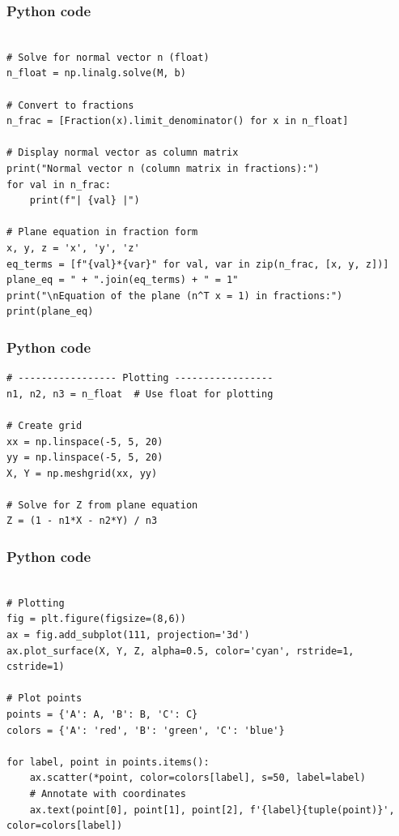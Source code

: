 \documentclass{beamer}
\begin{document}
\begin{frame}[fragile]                            
\frametitle{Python code}                
\begin{lstlisting}

# Solve for normal vector n (float)
n_float = np.linalg.solve(M, b)

# Convert to fractions
n_frac = [Fraction(x).limit_denominator() for x in n_float]

# Display normal vector as column matrix
print("Normal vector n (column matrix in fractions):")
for val in n_frac:
    print(f"| {val} |")

# Plane equation in fraction form
x, y, z = 'x', 'y', 'z'
eq_terms = [f"{val}*{var}" for val, var in zip(n_frac, [x, y, z])]
plane_eq = " + ".join(eq_terms) + " = 1"
print("\nEquation of the plane (n^T x = 1) in fractions:")
print(plane_eq)

\end{lstlisting}
\end{frame}

\begin{frame}[fragile]                            
\frametitle{Python code}                
\begin{lstlisting}
# ----------------- Plotting -----------------
n1, n2, n3 = n_float  # Use float for plotting

# Create grid
xx = np.linspace(-5, 5, 20)
yy = np.linspace(-5, 5, 20)
X, Y = np.meshgrid(xx, yy)

# Solve for Z from plane equation
Z = (1 - n1*X - n2*Y) / n3
\end{lstlisting}
\end{frame}

\begin{frame}[fragile]                            
\frametitle{Python code}                
\begin{lstlisting}

# Plotting
fig = plt.figure(figsize=(8,6))
ax = fig.add_subplot(111, projection='3d')
ax.plot_surface(X, Y, Z, alpha=0.5, color='cyan', rstride=1, cstride=1)

# Plot points
points = {'A': A, 'B': B, 'C': C}
colors = {'A': 'red', 'B': 'green', 'C': 'blue'}

for label, point in points.items():
    ax.scatter(*point, color=colors[label], s=50, label=label)
    # Annotate with coordinates
    ax.text(point[0], point[1], point[2], f'{label}{tuple(point)}', color=colors[label])
\end{lstlisting}
\end{frame}
\end{document}
